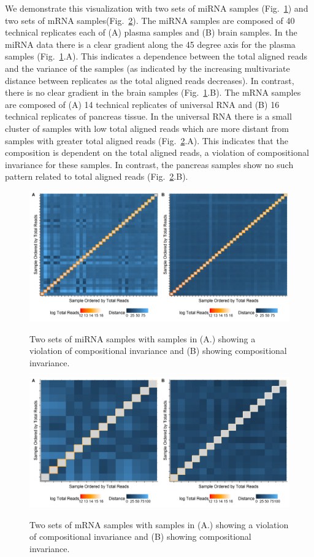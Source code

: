 \documentclass [10pt]{article}
\theoremstyle{definition}
\begin{document}
We demonstrate this visualization with two sets of miRNA samples (Fig.~\ref{miComp}) and two sets of mRNA samples(Fig.~\ref{celComp}).  The miRNA samples are composed of 40 technical replicates each of (A) plasma samples and (B) brain samples.  In the miRNA data there is a clear gradient along the 45 degree axis for the plasma samples (Fig.~\ref{miComp}.A).  This indicates a dependence between the total aligned reads and the variance of the samples (as indicated by the increasing multivariate distance between replicates as the total aligned reads decreases).  In contrast, there is no clear gradient in the brain samples (Fig.~\ref{miComp}.B).  The mRNA samples are composed of (A) 14 technical replicates of universal RNA and (B) 16 technical replicates of pancreas tissue.  In the universal RNA there is a small cluster of samples with low total aligned reads which are more distant from samples with greater total aligned reads (Fig.~\ref{celComp}.A).  This indicates that the composition is dependent on the total aligned reads, a violation of compositional invariance for these samples.  In contrast, the pancreas samples show no such pattern related to total aligned reads (Fig.~\ref{celComp}.B).

\begin{figure}
\includegraphics[scale=0.52]{./Figures/Plasma_Heatmap_Compare}
\label{miComp}
\caption{Two sets of miRNA samples with samples in (A.) showing a violation of compositional invariance and (B) showing compositional invariance.}
\end{figure}


\begin{figure}
\includegraphics[scale=0.52]{./Figures/CG_Heatmap_Compare}
\label{celComp}
\caption{Two sets of mRNA samples with samples in (A.) showing a violation of compositional invariance and (B) showing compositional invariance.}
\end{figure}
\end{document}
